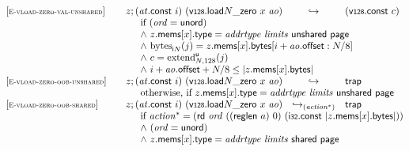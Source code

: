 $$\begin{array}[t]{@{}lrcl@{}l@{}}
{\begin{array}[t]{@{}l@{}}
\end{array}
} \\
{[\textsc{\scriptsize E{-}vload{-}zero{-}val{-}unshared}]} \quad & z ; ({\mathit{at}}{.}\mathsf{const}~i)~({\mathsf{v{\scriptstyle 128}}{.}\mathsf{load}}{{N}{\mathsf{\_}}{\mathsf{zero}}}~x~{\mathit{ao}}) & \hookrightarrow & (\mathsf{v{\scriptstyle 128}}{.}\mathsf{const}~c) &  \\
& \multicolumn{4}{@{}l@{}}{\quad
\quad
\begin{array}[t]{@{}l@{}}
\mbox{if}~ ({\mathit{ord}} = \mathsf{unord}) \\
{\land}~ z{.}\mathsf{mems}{}[x]{.}\mathsf{type} = {\mathit{addrtype}}~{\mathit{limits}}~\mathsf{unshared}~\mathsf{page} \\
{\land}~ {{\mathrm{bytes}}}_{{\mathsf{i}}{N}}(j) = z{.}\mathsf{mems}{}[x]{.}\mathsf{bytes}{}[i + {\mathit{ao}}{.}\mathsf{offset} : N / 8] \\
{\land}~ c = {{{{\mathrm{extend}}}_{N, 128}^{\mathsf{u}}}}{(j)} \\
{\land}~ i + {\mathit{ao}}{.}\mathsf{offset} + N / 8 \leq {|z{.}\mathsf{mems}{}[x]{.}\mathsf{bytes}|} \\
\end{array}
} \\
{[\textsc{\scriptsize E{-}vload{-}zero{-}oob{-}unshared}]} \quad & z ; ({\mathit{at}}{.}\mathsf{const}~i)~({\mathsf{v{\scriptstyle 128}}{.}\mathsf{load}}{{N}{\mathsf{\_}}{\mathsf{zero}}}~x~{\mathit{ao}}) & \hookrightarrow & \mathsf{trap} &  \\
& \multicolumn{4}{@{}l@{}}{\quad
\quad \mbox{otherwise, if}~ z{.}\mathsf{mems}{}[x]{.}\mathsf{type} = {\mathit{addrtype}}~{\mathit{limits}}~\mathsf{unshared}~\mathsf{page}
} \\
{[\textsc{\scriptsize E{-}vload{-}zero{-}oob{-}shared}]} \quad & z ; ({\mathit{at}}{.}\mathsf{const}~i)~({\mathsf{v{\scriptstyle 128}}{.}\mathsf{load}}{{N}{\mathsf{\_}}{\mathsf{zero}}}~x~{\mathit{ao}}) & {\hookrightarrow}_{({{\mathit{action}}^\ast})} {} & \mathsf{trap} &  \\
& \multicolumn{4}{@{}l@{}}{\quad
\quad
\begin{array}[t]{@{}l@{}}
\mbox{if}~ {{\mathit{action}}^\ast} = (\mathsf{rd}~{\mathit{ord}}~((\mathsf{reglen}~a)~0)~(\mathsf{i{\scriptstyle 32}}{.}\mathsf{const}~{|z{.}\mathsf{mems}{}[x]{.}\mathsf{bytes}|})) \\
{\land}~ ({\mathit{ord}} = \mathsf{unord}) \\
{\land}~ z{.}\mathsf{mems}{}[x]{.}\mathsf{type} = {\mathit{addrtype}}~{\mathit{limits}}~\mathsf{shared}~\mathsf{page} \\

\end{array}}
\end{array}$$
